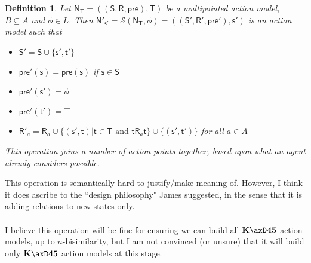 \documentclass{cshonours}
\newtheorem{defn}{Definition}[chapter]
\numberwithin{equation}{chapter}
\newcommand{\axK}{\ensuremath{\bf K}}
\newcommand{\axFo}{\ensuremath{\bf 4}}
\newcommand{\axFi}{\ensuremath{\bf 5}}
\newcommand{\aMod}[1]{
  \ensuremath {\mathrm{\mathsf{#1}}}
}
\newcommand{\evMo}{\aMod{N}}
\newcommand{\evM}{\evMo}
\newcommand{\evS}{\aMod{S}}
\newcommand{\evR}{\aMod{R}}
\newcommand{\evpr}{\aMod{pre}}
\newcommand{\evT}{\aMod{T}}
\newcommand{\evs}{\aMod{s}}
\newcommand{\evt}{\aMod{t}}
\begin{document}
\begin{defn}
  Let $\evM_\evT = ((\evS, \evR, \evpr), \evT)$ be a multipointed action model,
  $B \subseteq A$ and $\phi \in L$.
  Then $\evM'_{\evs'} = \mathcal{S}(\evM_\evT, \phi) = ((\evS', \evR', \evpr'),
      {\evs'})$ is an action model such that
  \begin{itemize}
    \item $\evS' = \evS \cup \{\evs', \evt'\}$
    \item $\evpr'(\evs) = \evpr(\evs)$ if $\evs \in \evS$
    \item $\evpr'(\evs') = \phi$
    \item $\evpr'(\evt') = \top$
    \item $\evR'_a = \evR_a \cup \{ (\evs', \evt) | \evt \in \evT \text{ and }
      \evt \evR_a \evt \} \cup \{(\evs', \evt')\}$ for all $a \in A$
  \end{itemize}
  This operation {\em joins} a number of action points together, based upon what
  an agent already considers possible.
\end{defn}

This operation is semantically hard to justify/make meaning of.
However, I think it does ascribe to the ``design philosophy" James suggested, in
the sense that it is adding relations to new states only.\\
\\
I believe this operation will be fine for ensuring we can build all
$\axK\axD\axFo\axFi$ action models, up to $n$-bisimilarity, but I am not
convinced (or unsure) that it will build only $\axK\axD\axFo\axFi$ action models
at this stage.
\end{document}
